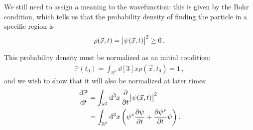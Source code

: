 \documentclass[main.tex]{subfiles}
\begin{document}
We still need to assign a meaning to the wavefunction: this is given by the Bohr condition, which tells us that the probability density of finding the particle in a specific  region is
%
\begin{align}
\rho (\vec{x}, t) = \abs{\psi (\vec{x}, t)}^2 \geq 0 
\,.
\end{align}

This probability density must be normalized as an initial condition:
%
\begin{align}
\mathbb{P} (t_0 ) = \int_{\mathbb{R}^3} \dd[3]{x} \rho (\vec{x}, t_0 ) = 1
\,,
\end{align}
%
and we wish to show that it will also be normalized at later times: 
%
\begin{align}
\dv{\mathbb{P}}{t} &= 
\int_{\mathbb{R}^3} \dd[3]{x} \pdv{}{t} \abs{\psi (\vec{x}, t)}^2  \\
&= \int_{\mathbb{R}^3} \dd[3]{x} \qty(\psi^{*} \pdv{\psi }{t} + \pdv{\psi^{*}}{t} \psi )
\,.
\end{align}
\end{document}
